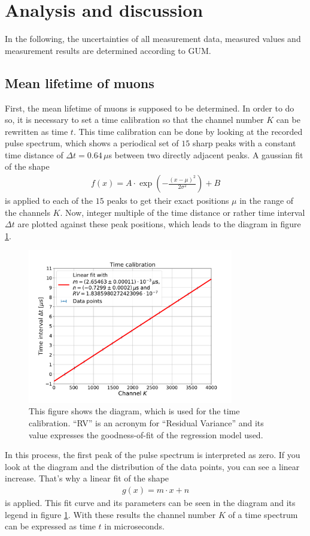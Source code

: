 \section{Analysis and discussion}

In the following, the uncertainties of all measurement data, measured values and measurement results are determined according to GUM\cite{gum}.

\subsection{Mean lifetime of muons}

First, the mean lifetime of muons is supposed to be determined.
In order to do so, it is necessary to set a time calibration so that the channel number $K$ can be rewritten as time $t$.
This time calibration can be done by looking at the recorded pulse spectrum, which shows a periodical set of $15$ sharp peaks with a constant time distance of $\Delta t=0.64\,\mu$s between two directly adjacent peaks.
A gaussian fit of the shape
\begin{align} \label{Gaussian}
f(x)=A\cdot\exp\left( -\frac{(x-\mu)^2}{2\sigma ^2}\right) + B
\end{align}
\noindent is applied to each of the $15$ peaks to get their exact positions $\mu$ in the range of the channels $K$.
Now, integer multiple of the time distance or rather time interval $\Delta t$ are plotted against these peak positions, which leads to the diagram in figure \ref{TimeCalibration}.
\begin{figure}[H]
	\centering
	\includegraphics[width=0.8\textwidth]{src/TimeCalibration}
	\caption{This figure shows the diagram, which is used for the time calibration. \enquote{RV} is an acronym for \enquote{Residual Variance} and its value expresses the goodness-of-fit of the regression model used.}
	\label{TimeCalibration}
\end{figure}
\noindent In this process, the first peak of the pulse spectrum is interpreted as zero.
If you look at the diagram and the distribution of the data points, you can see a linear increase.
That's why a linear fit of the shape 
\begin{align} \label{line}
g(x)=m\cdot x + n
\end{align}
\noindent is applied.
This fit curve and its parameters can be seen in the diagram and its legend in figure \ref{TimeCalibration}.
With these results the channel number $K$ of a time spectrum can be expressed as time $t$ in microseconds.

